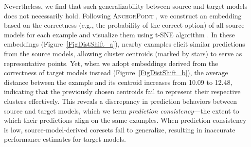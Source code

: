 Nevertheless, we find that such generalizability between source and target models does not necessarily hold.
Following \textsc{AnchorPoint} \citep{AP}, we construct an embedding based on the correctness (e.g., the probability of the correct option) of all source models for each example and visualize them using t-SNE algorithm \citep{tsne}.
In these embeddings (Figure~\ref{FigDistShift_a}), nearby examples elicit similar predictions from the source models, allowing cluster centroids (marked by stars) to serve as representative points. Yet, when we adopt embeddings derived from the correctness of target models instead (Figure~\ref{FigDistShift_b}), the average distance between the example and its centroid increases from 10.09 to 12.48, indicating that the previously chosen centroids fail to represent their respective clusters effectively.
This reveals a discrepancy in prediction behaviors between source and target models, which we term \textit{prediction consistency}—the extent to which their predictions align on the same examples. When prediction consistency is low, source-model-derived coresets fail to generalize, resulting in inaccurate performance estimates for target models.

